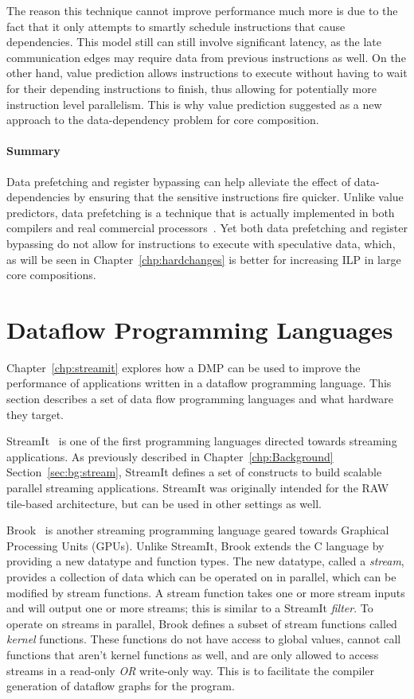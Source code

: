 The reason this technique cannot improve performance much more is due to the fact that it only attempts to smartly schedule instructions that cause dependencies.
This model still can still involve significant latency, as the late communication edges may require data from previous instructions as well.
On the other hand, value prediction allows instructions to execute without having to wait for their depending instructions to finish, thus allowing for potentially more instruction level parallelism.
This is why value prediction suggested as a new approach to the data-dependency problem for core composition.
\vspace{-1em}
\paragraph*{Summary}
Data prefetching and register bypassing can help alleviate the effect of data-dependencies by ensuring that the sensitive instructions fire quicker.
Unlike value predictors, data prefetching is a technique that is actually implemented in both compilers and real commercial processors~\cite{intelmanual}.
Yet both data prefetching and register bypassing do not allow for instructions to execute with speculative data, which, as will be seen in Chapter~\ref{chp:hardchanges} is better for increasing ILP in large core compositions.
\vspace{-1em}
\section{Dataflow Programming Languages}

Chapter~\ref{chp:streamit} explores how a DMP can be used to improve the performance of applications written in a dataflow programming language.
This section describes a set of data flow programming languages and what hardware they target.

StreamIt~\cite{theis2002streamit} is one of the first programming languages directed towards streaming applications.
As previously described in Chapter~\ref{chp:Background} Section~\ref{sec:bg:stream}, StreamIt defines a set of constructs to build scalable parallel streaming applications.
StreamIt was originally intended for the RAW~\cite{waingold1997raw} tile-based architecture, but can be used in other settings as well.

Brook~\cite{buck2004brook} is another streaming programming language geared towards Graphical Processing Units (GPUs).
Unlike StreamIt, Brook extends the C language by providing a new datatype and function types.
The new datatype, called a \textit{stream}, provides a collection of data which can be operated on in parallel, which can be modified by stream functions.
A stream function takes one or more stream inputs and will output one or more streams; this is similar to a StreamIt \textit{filter}.
To operate on streams in parallel, Brook defines a subset of stream functions called \textit{kernel} functions.
These functions do not have access to global values, cannot call functions that aren't kernel functions as well, and are only allowed to access streams in a read-only \textit{OR} write-only way.
This is to facilitate the compiler generation of dataflow graphs for the program.

